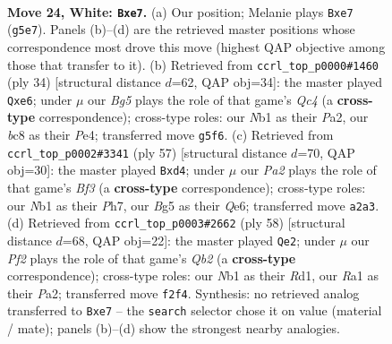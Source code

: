 \documentclass[11pt]{article}
\begin{document}
\clearpage

\begin{figure}[p]\centering
\begin{subfigure}{0.46\textwidth}\centering
\resizebox{\linewidth}{!}{%
\newchessgame
\chessboard[
  setfen={1rb1k2r/4q1pp/1p6/p2Q2B1/3p3P/8/PP3PP1/RN4K1 w - - 0 24},
  showmover=false,
  pgfstyle=straightmove, color=movearrow, markmove={g5-e7}
]}
\caption{}
\end{subfigure}\hfill
\begin{subfigure}{0.46\textwidth}\centering
\resizebox{\linewidth}{!}{%
\newchessgame
\chessboard[
  setfen={r3k2r/pp2bppp/2p1q3/2B5/2Q1PR2/8/PPP3PP/R5K1 w kq - 3 18},
  showmover=false,
  pgfstyle=straightmove, color=movearrow, markmove={c4-e6}
]}
\caption{}
\end{subfigure}
\\[4pt]
\begin{subfigure}{0.46\textwidth}\centering
\resizebox{\linewidth}{!}{%
\newchessgame
\chessboard[
  setfen={2r3k1/5p1p/p3qb2/1p4p1/1P1PQ1P1/P6P/5P1B/4R1K1 b - - 0 29},
  showmover=false,
  pgfstyle=straightmove, color=movearrow, markmove={f6-d4}
]}
\caption{}
\end{subfigure}\hfill
\begin{subfigure}{0.46\textwidth}\centering
\resizebox{\linewidth}{!}{%
\newchessgame
\chessboard[
  setfen={4rk2/ppq4p/4b1p1/3BPp2/2P5/6P1/PQ4KP/3R4 w - - 9 30},
  showmover=false,
  pgfstyle=straightmove, color=movearrow, markmove={b2-e2}
]}
\caption{}
\end{subfigure}
\caption{\textbf{Move 24, White: \texttt{Bxe7}.} (a) Our position; Melanie plays \texttt{Bxe7} (\texttt{g5e7}). Panels (b)--(d) are the retrieved master positions whose correspondence most drove this move (highest QAP objective among those that transfer to it). (b) Retrieved from \texttt{ccrl\_top\_p0000\#1460} (ply 34) [structural distance $d$=62, QAP obj=34]: the master played \texttt{Qxe6}; under $\mu$ our \emph{Bg5} plays the role of that game's \emph{Qc4} (a \textbf{cross-type} correspondence); cross-type roles: our \emph{N}b1 as their \emph{P}a2, our \emph{b}c8 as their \emph{P}e4; transferred move \texttt{g5f6}. (c) Retrieved from \texttt{ccrl\_top\_p0002\#3341} (ply 57) [structural distance $d$=70, QAP obj=30]: the master played \texttt{Bxd4}; under $\mu$ our \emph{Pa2} plays the role of that game's \emph{Bf3} (a \textbf{cross-type} correspondence); cross-type roles: our \emph{N}b1 as their \emph{P}h7, our \emph{B}g5 as their \emph{Q}e6; transferred move \texttt{a2a3}. (d) Retrieved from \texttt{ccrl\_top\_p0003\#2662} (ply 58) [structural distance $d$=68, QAP obj=22]: the master played \texttt{Qe2}; under $\mu$ our \emph{Pf2} plays the role of that game's \emph{Qb2} (a \textbf{cross-type} correspondence); cross-type roles: our \emph{N}b1 as their \emph{R}d1, our \emph{R}a1 as their \emph{P}a2; transferred move \texttt{f2f4}. Synthesis: no retrieved analog transferred to \texttt{Bxe7} -- the \texttt{search} selector chose it on value (material / mate); panels (b)--(d) show the strongest nearby analogies.}
\label{fig:thought-m46}
\end{figure}
\end{document}
